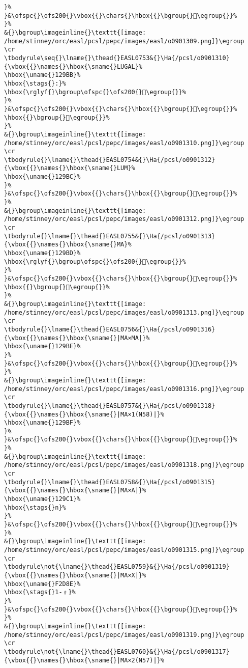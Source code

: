 \begin{verbatim}
}%
}&\ofspc{}\ofs200{}\vbox{{}\chars{}\hbox{{}\bgroup{}󲤀\egroup{}}%
}%
&{}\bgroup\imageinline{}\texttt{[image: /home/stinney/orc/easl/pcsl/pepc/images/easl/o0901309.png]}\egroup
\cr
\tbodyrule\seq{}\lname{}\thead{}EASL0753&{}\Ha{/pcsl/o0901310}{\vbox{{}\names{}\hbox{\sname{}LUGAL}%
\hbox{\uname{}129BB}%
\hbox{\stags{}:}%
\hbox{\rglyf{}\bgroup\ofspc{}\ofs200{}𒦻\egroup{}}%
}%
}&\ofspc{}\ofs200{}\vbox{{}\chars{}\hbox{{}\bgroup{}𒦺\egroup{}}%
\hbox{{}\bgroup{}𒦻\egroup{}}%
}%
&{}\bgroup\imageinline{}\texttt{[image: /home/stinney/orc/easl/pcsl/pepc/images/easl/o0901310.png]}\egroup
\cr
\tbodyrule{}\lname{}\thead{}EASL0754&{}\Ha{/pcsl/o0901312}{\vbox{{}\names{}\hbox{\sname{}LUM}%
\hbox{\uname{}129BC}%
}%
}&\ofspc{}\ofs200{}\vbox{{}\chars{}\hbox{{}\bgroup{}𒦼\egroup{}}%
}%
&{}\bgroup\imageinline{}\texttt{[image: /home/stinney/orc/easl/pcsl/pepc/images/easl/o0901312.png]}\egroup
\cr
\tbodyrule{}\lname{}\thead{}EASL0755&{}\Ha{/pcsl/o0901313}{\vbox{{}\names{}\hbox{\sname{}MA}%
\hbox{\uname{}129BD}%
\hbox{\rglyf{}\bgroup\ofspc{}\ofs200{}𒦽\egroup{}}%
}%
}&\ofspc{}\ofs200{}\vbox{{}\chars{}\hbox{{}\bgroup{}𒦽\egroup{}}%
\hbox{{}\bgroup{}𒧀\egroup{}}%
}%
&{}\bgroup\imageinline{}\texttt{[image: /home/stinney/orc/easl/pcsl/pepc/images/easl/o0901313.png]}\egroup
\cr
\tbodyrule{}\lname{}\thead{}EASL0756&{}\Ha{/pcsl/o0901316}{\vbox{{}\names{}\hbox{\sname{}|MA×MA|}%
\hbox{\uname{}129BE}%
}%
}&\ofspc{}\ofs200{}\vbox{{}\chars{}\hbox{{}\bgroup{}𒦾\egroup{}}%
}%
&{}\bgroup\imageinline{}\texttt{[image: /home/stinney/orc/easl/pcsl/pepc/images/easl/o0901316.png]}\egroup
\cr
\tbodyrule{}\lname{}\thead{}EASL0757&{}\Ha{/pcsl/o0901318}{\vbox{{}\names{}\hbox{\sname{}|MA×1(N58)|}%
\hbox{\uname{}129BF}%
}%
}&\ofspc{}\ofs200{}\vbox{{}\chars{}\hbox{{}\bgroup{}𒦿\egroup{}}%
}%
&{}\bgroup\imageinline{}\texttt{[image: /home/stinney/orc/easl/pcsl/pepc/images/easl/o0901318.png]}\egroup
\cr
\tbodyrule{}\lname{}\thead{}EASL0758&{}\Ha{/pcsl/o0901315}{\vbox{{}\names{}\hbox{\sname{}|MA×A|}%
\hbox{\uname{}129C1}%
\hbox{\stags{}n}%
}%
}&\ofspc{}\ofs200{}\vbox{{}\chars{}\hbox{{}\bgroup{}𒧁\egroup{}}%
}%
&{}\bgroup\imageinline{}\texttt{[image: /home/stinney/orc/easl/pcsl/pepc/images/easl/o0901315.png]}\egroup
\cr
\tbodyrule\not{\lname{}\thead{}EASL0759}&{}\Ha{/pcsl/o0901319}{\vbox{{}\names{}\hbox{\sname{}|MA×X|}%
\hbox{\uname{}F2D8E}%
\hbox{\stags{}1-﹟}%
}%
}&\ofspc{}\ofs200{}\vbox{{}\chars{}\hbox{{}\bgroup{}󲶎\egroup{}}%
}%
&{}\bgroup\imageinline{}\texttt{[image: /home/stinney/orc/easl/pcsl/pepc/images/easl/o0901319.png]}\egroup
\cr
\tbodyrule\not{\lname{}\thead{}EASL0760}&{}\Ha{/pcsl/o0901317}{\vbox{{}\names{}\hbox{\sname{}|MA×2(N57)|}%

\end{verbatim}
